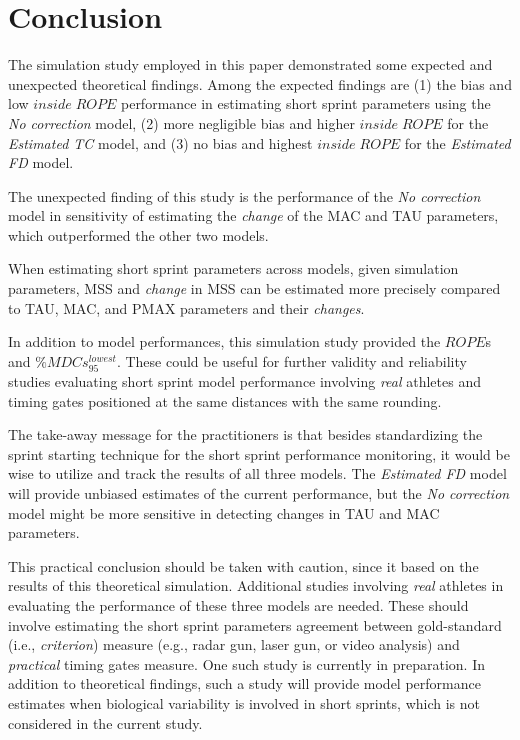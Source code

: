 \documentclass[fleqn,10pt,lineno]{wlpeerj} %
\begin{document}
\hypertarget{conclusion}{%
\section{Conclusion}\label{conclusion}}

The simulation study employed in this paper demonstrated some expected and unexpected theoretical findings. Among the expected findings are (1) the bias and low \(inside \; ROPE\) performance in estimating short sprint parameters using the \emph{No correction} model, (2) more negligible bias and higher \(inside \; ROPE\) for the \emph{Estimated TC} model, and (3) no bias and highest \(inside \; ROPE\) for the \emph{Estimated FD} model.

The unexpected finding of this study is the performance of the \emph{No correction} model in sensitivity of estimating the \emph{change} of the MAC and TAU parameters, which outperformed the other two models.

When estimating short sprint parameters across models, given simulation parameters, MSS and \emph{change} in MSS can be estimated more precisely compared to TAU, MAC, and PMAX parameters and their \emph{changes}.

In addition to model performances, this simulation study provided the \(ROPE\)s and \(\%MDCs_{95}^{lowest}\). These could be useful for further validity and reliability studies evaluating short sprint model performance involving \emph{real} athletes and timing gates positioned at the same distances with the same rounding.

The take-away message for the practitioners is that besides standardizing the sprint starting technique for the short sprint performance monitoring, it would be wise to utilize and track the results of all three models. The \emph{Estimated FD} model will provide unbiased estimates of the current performance, but the \emph{No correction} model might be more sensitive in detecting changes in TAU and MAC parameters.

This practical conclusion should be taken with caution, since it based on the results of this theoretical simulation. Additional studies involving \emph{real} athletes in evaluating the performance of these three models are needed. These should involve estimating the short sprint parameters agreement between gold-standard (i.e., \emph{criterion}) measure (e.g., radar gun, laser gun, or video analysis) and \emph{practical} timing gates measure. One such study is currently in preparation. In addition to theoretical findings, such a study will provide model performance estimates when biological variability is involved in short sprints, which is not considered in the current study.
\end{document}
